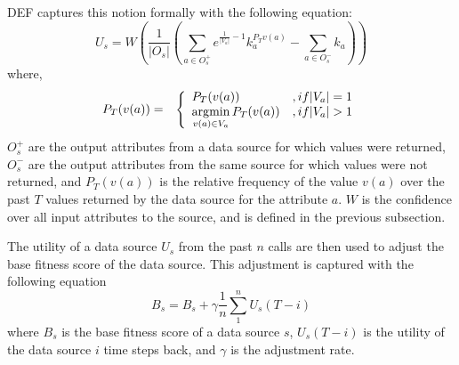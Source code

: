 DEF captures this notion formally with the following equation:
%
%
\begin{equation}
	U_s = W \left( \frac{1}{|O_s|} \left( \displaystyle\sum\limits_{a \in O_s^+} e^{\frac{1}{|V_a|} - 1}k_a^{P_Tv(a)} - \displaystyle\sum\limits_{a \in O_s^-}k_a \right) \right) \nonumber
\end{equation}
where,
\begin{eqnarray}
	P_T(v(a)) &=& \left\lbrace \begin{array}{ll} P_T (v(a)) & \relax{, if } |V_a|= 1 \\ \operatorname*{\arg\!\min}\limits_{v(a) \in V_a} P_T(v(a)) & \relax{, if } |V_a| > 1 \end{array} \right.
\end{eqnarray}
$O_s^+$ are the output attributes from a data source for which values were returned, $O_s^-$ 
are the output attributes from the same source for which values were not returned, and $P_T(v(a))$
is the relative frequency of the value $v(a)$ over the past $T$ values returned by the data source for 
the attribute $a$. $W$ is the confidence over all input attributes to the source, and is defined
in the previous subsection.

The utility of a data source $U_s$ from the past $n$ calls are then used to adjust the base fitness score 
of the data source. This adjustment is captured with the following equation
\begin{equation}
 B_s= B_s + \gamma \frac{1}{n} \displaystyle\sum\limits_{1}^{n}U_s(T - i)
\end{equation}
where $B_s$ is the base fitness score of a data source $s$, $U_s(T-i)$ is the utility of the data source $i$ time steps
back, and $\gamma$ is the adjustment rate.

%
%
